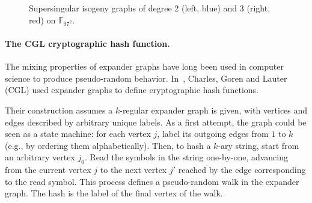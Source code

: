 \documentclass[10pt]{article}
\theoremstyle{plain}
\theoremstyle{definition}
\def\F{\ensuremath{\mathbb{F}}}
\begin{document}
\begin{figure}
  \centering
  \caption{Supersingular isogeny graphs of degree 2 (left, blue) and 3
    (right, red) on $\F_{97^2}$.}
  \label{fig:sup-97-2-3}
\end{figure}


\paragraph{The CGL cryptographic hash function.}
The mixing properties of expander graphs have long been used in
computer science to produce pseudo-random behavior. %
In~\cite{JC:ChaLauGor09}, Charles, Goren and Lauter (CGL) used
expander graphs to define cryptographic hash functions. %

Their construction assumes a $k$-regular expander graph is given, with
vertices and edges described by arbitrary unique labels. %
As a first attempt, the graph could be seen as a state machine: for
each vertex $j$, label its outgoing edges from $1$ to $k$ (e.g., by
ordering them alphabetically). %
Then, to hash a $k$-ary string, start from an arbitrary vertex
$j_0$. %
Read the symbols in the string one-by-one, advancing from the current
vertex $j$ to the next vertex $j'$ reached by the edge corresponding
to the read symbol. %
This process defines a pseudo-random walk in the expander graph. %
The hash is the label of the final vertex of the walk.
\end{document}
